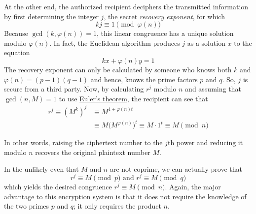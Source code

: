\documentclass{article}
\newcounter{theorem}[section]
\begin{document}
At the other end, the authorized recipient deciphers the transmitted information by first determining the integer $j$, the secret \textit{recovery exponent}, for which 
\begin{equation}
  k j \equiv 1 \pmod{\varphi(n)}
\end{equation}
Because $\gcd(k, \varphi(n)) = 1$, this linear congruence has a unique solution modulo $\varphi(n)$. In fact, the Euclidean algorithm produces $j$ as a solution $x$ to the equation 
\begin{equation}
  kx + \varphi(n) y = 1
\end{equation}
The recovery exponent can only be calculated by someone who knows both $k$ and $\varphi(n) = (p-1) (q-1)$ and hence, knows the prime factors $p$ and $q$. So, $j$ is secure from a third party. Now, by calculating $r^j$ modulo $n$ and assuming that $\gcd(n, M) = 1$ to use \hyperref[thm:eulers-theorem]{Euler's theorem}, the recipient can see that 
\begin{align*}
    r^j \equiv (M^k)^j & \equiv M^{1 + \varphi(n) t} \\
    & \equiv M \big( M^{\varphi(n)} \big)^t \equiv M \cdot 1^t \equiv M \pmod{n}
\end{align*}

In other words, raising the ciphertext number to the $j$th power and reducing it modulo $n$ recovers the original plaintext number $M$. 

In the unlikely even that $M$ and $n$ are not coprime, we can actually prove that
\begin{equation}
  r^j \equiv M \pmod{p} \text{ and } r^j \equiv M \pmod{q}
\end{equation}
which yields the desired congruence $r^j \equiv M \pmod{n}$. Again, the major advantage to this encryption system is that it does not require the knowledge of the two primes $p$ and $q$; it only requires the product $n$. 
\end{document}
